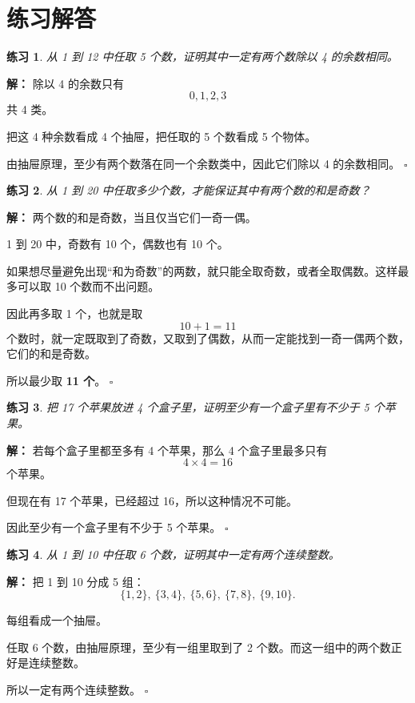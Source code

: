 \documentclass[11pt,a4paper,fontset=fandol]{ctexart}
\theoremstyle{formaltheorem}
\theoremstyle{formalexample}
\newtheorem{exercise}{练习}[section]
\newenvironment{solution}{\par\noindent\textbf{解：}}{\hfill$\square$\par}
\begin{document}
\newpage
\appendix
\section{练习解答}

\begin{exercise}
从 1 到 12 中任取 5 个数，证明其中一定有两个数除以 4 的余数相同。
\end{exercise}

\begin{solution}
除以 4 的余数只有
\[
0,1,2,3
\]
共 4 类。

把这 4 种余数看成 4 个抽屉，把任取的 5 个数看成 5 个物体。

由抽屉原理，至少有两个数落在同一个余数类中，因此它们除以 4 的余数相同。
\end{solution}

\begin{exercise}
从 1 到 20 中任取多少个数，才能保证其中有两个数的和是奇数？
\end{exercise}

\begin{solution}
两个数的和是奇数，当且仅当它们一奇一偶。

1 到 20 中，奇数有 10 个，偶数也有 10 个。

如果想尽量避免出现“和为奇数”的两数，就只能全取奇数，或者全取偶数。这样最多可以取 10 个数而不出问题。

因此再多取 1 个，也就是取
\[
10+1=11
\]
个数时，就一定既取到了奇数，又取到了偶数，从而一定能找到一奇一偶两个数，它们的和是奇数。

所以最少取 \textbf{11 个}。
\end{solution}

\begin{exercise}
把 17 个苹果放进 4 个盒子里，证明至少有一个盒子里有不少于 5 个苹果。
\end{exercise}

\begin{solution}
若每个盒子里都至多有 4 个苹果，那么 4 个盒子里最多只有
\[
4\times 4=16
\]
个苹果。

但现在有 17 个苹果，已经超过 16，所以这种情况不可能。

因此至少有一个盒子里有不少于 5 个苹果。
\end{solution}

\begin{exercise}
从 1 到 10 中任取 6 个数，证明其中一定有两个连续整数。
\end{exercise}

\begin{solution}
把 1 到 10 分成 5 组：
\[
\{1,2\},\ \{3,4\},\ \{5,6\},\ \{7,8\},\ \{9,10\}.
\]

每组看成一个抽屉。

任取 6 个数，由抽屉原理，至少有一组里取到了 2 个数。而这一组中的两个数正好是连续整数。

所以一定有两个连续整数。
\end{solution}
\end{document}
